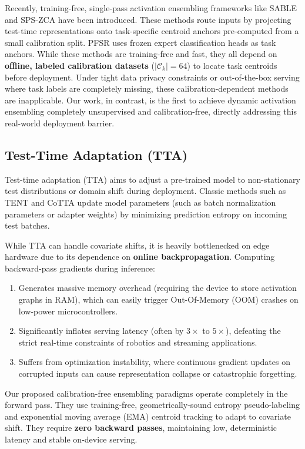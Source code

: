 Recently, training-free, single-pass activation ensembling frameworks like SABLE \cite{sable} and SPS-ZCA \cite{sps_zca} have been introduced. These methods route inputs by projecting test-time representations onto task-specific centroid anchors pre-computed from a small calibration split. PFSR \cite{pfsr} uses frozen expert classification heads as task anchors. While these methods are training-free and fast, they all depend on \textbf{offline, labeled calibration datasets} ($|\mathcal{C}_k|=64$) to locate task centroids before deployment. Under tight data privacy constraints or out-of-the-box serving where task labels are completely missing, these calibration-dependent methods are inapplicable. Our work, in contrast, is the first to achieve dynamic activation ensembling completely unsupervised and calibration-free, directly addressing this real-world deployment barrier.

\subsection{Test-Time Adaptation (TTA)}
Test-time adaptation (TTA) aims to adjust a pre-trained model to non-stationary test distributions or domain shift during deployment. Classic methods such as TENT \cite{wang2020tent} and CoTTA \cite{wang2022continual} update model parameters (such as batch normalization parameters or adapter weights) by minimizing prediction entropy on incoming test batches. 

While TTA can handle covariate shifts, it is heavily bottlenecked on edge hardware due to its dependence on \textbf{online backpropagation}. Computing backward-pass gradients during inference:
\begin{enumerate}
    \item Generates massive memory overhead (requiring the device to store activation graphs in RAM), which can easily trigger Out-Of-Memory (OOM) crashes on low-power microcontrollers.
    \item Significantly inflates serving latency (often by $3\times$ to $5\times$), defeating the strict real-time constraints of robotics and streaming applications.
    \item Suffers from optimization instability, where continuous gradient updates on corrupted inputs can cause representation collapse or catastrophic forgetting.
\end{enumerate}
Our proposed calibration-free ensembling paradigms operate completely in the forward pass. They use training-free, geometrically-sound entropy pseudo-labeling and exponential moving average (EMA) centroid tracking to adapt to covariate shift. They require \textbf{zero backward passes}, maintaining low, deterministic latency and stable on-device serving.
